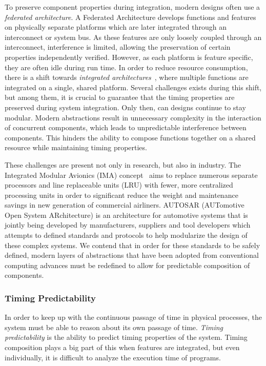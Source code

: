 To preserve component properties during integration, modern designs often use a \textit{federated architecture}.
A Federated Architecture develops functions and features on physically separate platforms which are later integrated through an interconnect or system bus. 
As these features are only loosely coupled through an interconnect, interference is limited, allowing the preservation of certain properties independently verified. 
However, as each platform is feature specific, they are often idle during run time.
In order to reduce resource consumption, there is a shift towards \textit{integrated architectures}~\cite{Obermaisser2009FedtoIMA,AvionicsWatkins2007IMA}, where multiple functions are integrated on a single, shared platform.
Several challenges exists during this shift, but among them, it is crucial to guarantee that the timing properties are preserved during system integration.
Only then, can designs continue to stay modular. 
Modern abstractions result in unnecessary complexity in the interaction of concurrent components, which leads to unpredictable interference between components. 
This hinders the ability to compose functions together on a shared resource while maintaining timing properties. 

These challenges are present not only in research, but also in industry.  
The Integrated Modular Avionics (IMA) concept~\cite{IMA} aims to replace numerous separate processors and line replaceable units (LRU) with fewer, more centralized processing units in order to significant reduce the weight and maintenance savings in new generation of commercial airliners.
AUTOSAR (AUTomotive Open System ARchitecture)\cite{autosarsite} is an architecture for automotive systems that is jointly being developed by manufacturers, suppliers and tool developers which attempts to defined standards and protocols to help modularize the design of these complex systems.
We contend that in order for these standards to be safely defined, modern layers of abstractions that have been adopted from conventional computing advances must be redefined to allow for  predictable composition of components.  

\subsubsection{Timing Predictability}
In order to keep up with the continuous passage of time in physical processes, the system must be able to reason about its own passage of time.
\textit{Timing predictability} is the ability to predict timing properties of the system.
Timing composition plays a big part of this when features are integrated, but even individually, it is difficult to analyze the execution time of programs.

